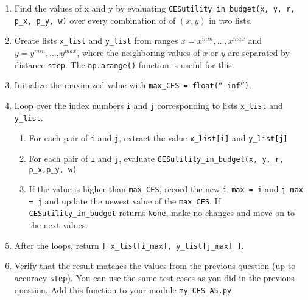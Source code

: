 \documentclass[11pt]{exam}
\begin{document}
\begin{questions}
\begin{parts}
\begin{enumerate}
    \item Find the values of x and y by evaluating \texttt{CESutility\_in\_budget(x, y, r, p\_x, p\_y, w)} over every combination of of $(x, y)$ in two lists.
    \item Create lists \texttt{x\_list} and \texttt{y\_list} from ranges $x = x^{min}, \dotsc, x^{max}$ and $y = y^{min}, \dotsc,  y^{max}$, where the neighboring values of $x$ or $y$ are separated by distance \texttt{step}. The \texttt{np.arange()} function is useful for this.
    \item Initialize the maximized value with \texttt{max\_CES = float(``-inf'')}.
    \item Loop over the index numbers \texttt{i} and \texttt{j} corresponding to lists \texttt{x\_list} and \texttt{y\_list}.
    \begin{enumerate}
        \item For each pair of \texttt{i} and \texttt{j}, extract the value \texttt{x\_list[i]} and \texttt{y\_list[j]}
        \item For each pair of \texttt{i} and \texttt{j}, evaluate \texttt{CESutility\_in\_budget(x, y, r, p\_x,p\_y, w)}
        \item If the value is higher than \texttt{max\_CES}, record the new \texttt{i\_max = i} and \texttt{j\_max = j} and update the newest value of the \texttt{max\_CES}. If \texttt{CESutility\_in\_budget} returns \texttt{None}, make no changes and move on to the next values.  
    \end{enumerate}

    \item After the loops, return \texttt{[ x\_list[i\_max], y\_list[j\_max] ]}.

    \item Verify that the result matches the values from the previous question (up to accuracy \texttt{step}). You can use the same test cases as you did in the previous question. Add this function to your module \texttt{my\_CES\_A5.py}
\end{enumerate}

        \end{parts}

    \end{questions}
\end{document}
